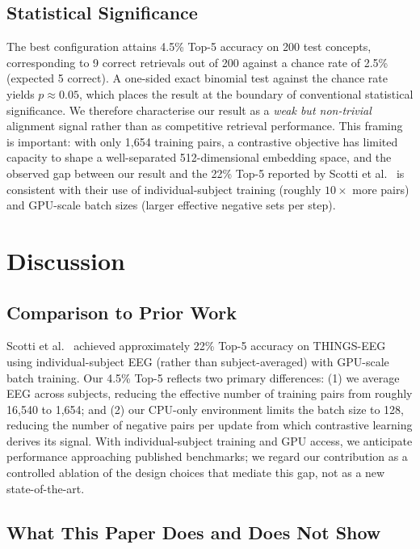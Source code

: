 \documentclass[conference]{IEEEtran}
\begin{document}
\subsection{Statistical Significance}
\label{sec:stats}

The best configuration attains 4.5\% Top-5
accuracy on 200 test concepts, corresponding
to 9 correct retrievals out of 200 against
a chance rate of 2.5\% (expected 5 correct).
A one-sided exact binomial test against
the chance rate yields $p \approx 0.05$,
which places the result at the boundary of
conventional statistical significance. We
therefore characterise our result as a
\emph{weak but non-trivial} alignment signal
rather than as competitive retrieval
performance. This framing is important:
with only 1{,}654 training pairs, a
contrastive objective has limited capacity
to shape a well-separated 512-dimensional
embedding space, and the observed gap
between our result and the 22\% Top-5
reported by Scotti et al.~\cite{scotti2023}
is consistent with their use of
individual-subject training (roughly $10\times$
more pairs) and GPU-scale batch sizes
(larger effective negative sets per step).

\section{Discussion}
\label{sec:disc}

\subsection{Comparison to Prior Work}

Scotti et al.~\cite{scotti2023} achieved
approximately 22\% Top-5 accuracy on
THINGS-EEG using individual-subject EEG
(rather than subject-averaged) with
GPU-scale batch training. Our 4.5\% Top-5
reflects two primary differences: (1) we
average EEG across subjects, reducing the
effective number of training pairs from
roughly 16{,}540 to 1{,}654; and (2) our
CPU-only environment limits the batch size
to 128, reducing the number of negative
pairs per update from which contrastive
learning derives its signal. With
individual-subject training and GPU access,
we anticipate performance approaching
published benchmarks; we regard our
contribution as a controlled ablation of
the design choices that mediate this gap,
not as a new state-of-the-art.

\subsection{What This Paper Does and Does Not Show}
\end{document}
